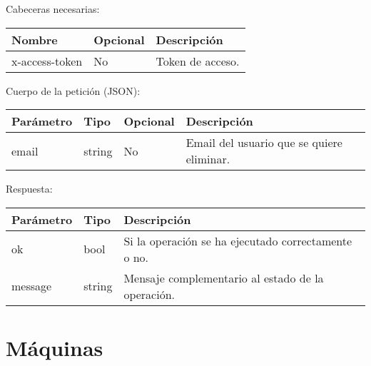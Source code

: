 Cabeceras necesarias:
\begin{table}[h!]
	\centering
	\begin{adjustbox}{max width=\textwidth}
	\begin{tabular}{|l|l|l|}
		\hline
		Nombre & Opcional & Descripción \\ \hline
		x-access-token & No & Token de acceso. \\ \hline
	\end{tabular}
\end{adjustbox}
\end{table}

Cuerpo de la petición (JSON):
\begin{table}[!h]
	\centering
	\begin{adjustbox}{max width=\textwidth}
	\begin{tabular}{|l|l|l|l|}
		\hline
		Parámetro & Tipo & Opcional & Descripción \\ \hline
		email & string & No & Email del usuario que se quiere eliminar. \\ \hline
	\end{tabular}
\end{adjustbox}
\end{table}

Respuesta:
\begin{table}[!h]
	\centering
	\begin{adjustbox}{max width=\textwidth}
	\begin{tabular}{|l|l|l|}
		\hline
		Parámetro & Tipo & Descripción \\ \hline
		ok & bool & Si la operación se ha ejecutado correctamente o no. \\ \hline
		message & string & Mensaje complementario al estado de la operación. \\ \hline
	\end{tabular}
\end{adjustbox}
\end{table}





\section{Máquinas}

